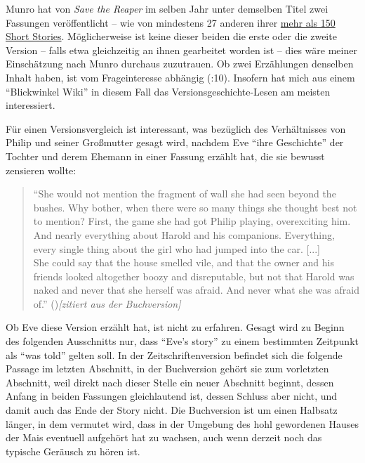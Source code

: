 \documentclass[fontsize=12pt]{scrartcl}
\begin{document}
Munro hat von \textit{Save the Reaper} im selben Jahr unter demselben Titel zwei Fassungen ver\"of\-fent\-licht -- wie von mindestens 27 anderen ihrer \href{https://en.wikipedia.org/w/index.php?title=List_of_short_stories_by_Alice_Munro&oldid=643370478}{mehr als 150 Short Stories}. 
M\"oglicherweise ist keine dieser beiden die erste oder die zweite Version -- falls etwa gleichzeitig an ihnen gearbeitet worden ist -- dies w\"are meiner Einsch\"atzung nach Munro durchaus zuzutrauen. Ob zwei Erz\"ahlungen denselben Inhalt haben, ist vom Frageinteresse abh\"angig (\cite{Lamarque2014}:10). Insofern hat mich aus einem "`Blickwinkel Wiki"' in diesem Fall das Versionsgeschichte-Lesen am meisten interessiert.

F\"ur einen Versionsvergleich ist interessant, was bez\"uglich des Verh\"altnisses von Philip und seiner Gro{\ss}mutter gesagt wird, nachdem Eve "`ihre Geschichte"' der Tochter und derem Ehemann in einer Fassung erz\"ahlt hat, die sie bewusst zensieren wollte:
 
\singlespacing
\begin{quote}
"`She would not mention the fragment of wall she had seen beyond the bushes. Why bother, when there were so many things she thought best not to mention? First, the game she had got Philip playing, overexciting him. And nearly everything about Harold and his companions. Everything, every single thing about the girl who had jumped into the car. [...]\\
She could say that the house smelled vile, and that the owner and his friends looked altogether boozy and disreputable, but not that Harold was naked and never that she herself was afraid. And never what she was afraid of."' (\cite{Munro1998B})\textit{[zitiert aus der Buchversion]}
\end{quote}
\onehalfspacing

Ob Eve diese Version erz\"ahlt hat, ist nicht zu erfahren. Gesagt wird zu Beginn des folgenden Ausschnitts nur, dass "`Eve's story"' zu einem bestimmten Zeitpunkt als "`was told"' gelten soll. In der Zeitschriftenversion befindet sich die folgende Passage im letzten Abschnitt, in der Buchversion geh\"ort sie zum vorletzten Abschnitt, weil direkt nach dieser Stelle ein neuer Abschnitt beginnt, dessen Anfang in beiden Fassungen gleichlautend ist, dessen Schluss aber nicht, und damit auch das Ende der Story nicht. Die Buchversion ist um einen Halbsatz l\"anger, in dem vermutet wird, dass in der Umgebung des hohl gewordenen Hauses der Mais eventuell aufgeh\"ort hat zu wachsen, auch wenn derzeit noch das ty\-pische Ger\"ausch zu h\"oren ist. 
\end{document}
